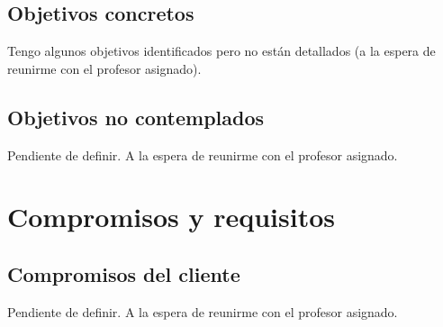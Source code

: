 \subsection{Objetivos concretos}
\par Tengo algunos objetivos identificados pero no están detallados (a la espera de reunirme con el profesor
asignado).
\begin{comment}
    \pfg{objetivos concretos. múltiples, y deben necesariamente presentarse numerados.}
    \pfg{\ul{objetivos concretos deben describirse con la corrección suficiente como para que los miembros del tribunal examinador puedan objetivamente de\-ter\-mi\-nar o me\-dir su gra\-do de cum\-pli\-mien\-to.}}
    \pfg{verificables por terceras personas}
    \begin{enumerate}
      \item \shit
      \item \shit
      \item \shit
    \end{enumerate}

    \pfg{Deberá quedar claro, en este apartado, la relación entre los objetivos concretos y el objetivo global, mediante
    la explicación de cómo la consecución de los primeros consigue la con\-se\-cu\-ción del segundo.}
    \shit

    \pfg{Deberá especificarse si el tema está amparado por el Plan Nacional de Investigación Científica,
    Desarrollo e Innovación Tecnológica vigente. En caso afirmativo, deberá especificarse en qué
    Programa Nacional y en qué apartado.}
    \shit
\end{comment}

\subsection{Objetivos no contemplados}
\par Pendiente de definir. A la espera de reunirme con el profesor asignado.

\section{Compromisos y requisitos}
\subsection{Compromisos del cliente}
\par Pendiente de definir. A la espera de reunirme con el profesor asignado.

